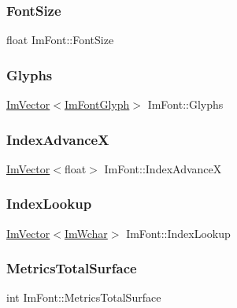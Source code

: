 \subsubsection{\texorpdfstring{Font\+Size}{FontSize}}
{\footnotesize\ttfamily float Im\+Font\+::\+Font\+Size}

\mbox{\label{struct_im_font_a1a0901fc1a8cbd41d582d6cef4946bc9}} 
\subsubsection{\texorpdfstring{Glyphs}{Glyphs}}
{\footnotesize\ttfamily \mbox{\hyperlink{class_im_vector}{Im\+Vector}}$<$\mbox{\hyperlink{struct_im_font_glyph}{Im\+Font\+Glyph}}$>$ Im\+Font\+::\+Glyphs}

\mbox{\label{struct_im_font_af906476eda06d8a842d0a843a247f530}} 
\subsubsection{\texorpdfstring{Index\+AdvanceX}{IndexAdvanceX}}
{\footnotesize\ttfamily \mbox{\hyperlink{class_im_vector}{Im\+Vector}}$<$float$>$ Im\+Font\+::\+Index\+AdvanceX}

\mbox{\label{struct_im_font_a0c948f3741da03da9bc1731e236173c8}} 
\subsubsection{\texorpdfstring{Index\+Lookup}{IndexLookup}}
{\footnotesize\ttfamily \mbox{\hyperlink{class_im_vector}{Im\+Vector}}$<$\mbox{\hyperlink{imgui_8h_af2c7badaf05a0008e15ef76d40875e97}{Im\+Wchar}}$>$ Im\+Font\+::\+Index\+Lookup}

\mbox{\label{struct_im_font_a8087b2ee8b27dcf5c6e30a8318f87cc7}} 
\subsubsection{\texorpdfstring{Metrics\+Total\+Surface}{MetricsTotalSurface}}
{\footnotesize\ttfamily int Im\+Font\+::\+Metrics\+Total\+Surface}

